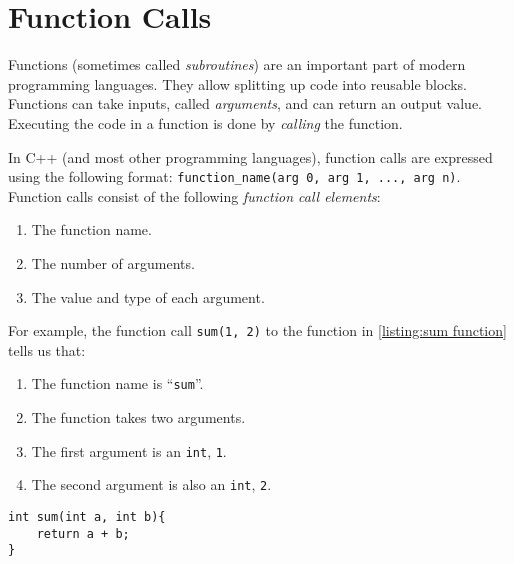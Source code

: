 \section{Function Calls}\label{section:function calls}
Functions (sometimes called \emph{subroutines}) are an important part of modern programming languages. They allow splitting up code into reusable blocks. Functions can take inputs, called \emph{arguments}, and can return an output value. Executing the code in a function is done by \emph{calling} the function.

In C++ (and most other programming languages), function calls are expressed using the following format: \texttt{function\_name(arg 0, arg 1, ..., arg n)}. Function calls consist of the following \emph{function call elements}:
\begin{enumerate}
    \item The function name.
    \item The number of arguments.
    \item The value and type of each argument.
\end{enumerate}

For example, the function call \texttt{sum(1, 2)} to the function in \autoref{listing:sum function} tells us that:
\begin{enumerate}
    \item The function name is ``\texttt{sum}''.
    \item The function takes two arguments.
    \item The first argument is an \texttt{int}, \texttt{1}.
    \item The second argument is also an \texttt{int}, \texttt{2}.
\end{enumerate}

\begin{lstlisting}[label={listing:sum function}, caption={A C function that adds to integers together.}, captionpos=b]
int sum(int a, int b){
    return a + b;
}
\end{lstlisting}




